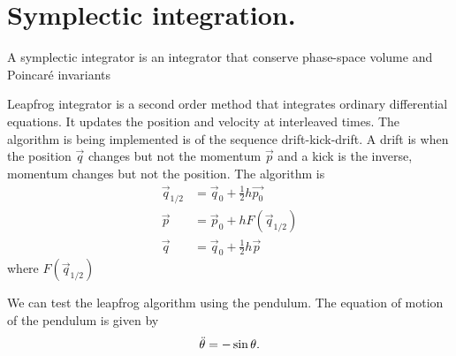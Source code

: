 \section{Symplectic integration.}
A symplectic integrator is an integrator that conserve phase-space volume and Poincar\' e invariants \cite{BinneyT_}

Leapfrog integrator is a second order method that integrates ordinary differential equations. It updates the position and velocity at interleaved times. The algorithm is being implemented is of the sequence drift-kick-drift. A drift is when the position $\Vec{q}$ changes but not the momentum $\Vec{p}$ and a kick is the inverse, momentum changes but not the position. The algorithm is
\begin{align*}
    \Vec{q}_{1/2}&=\Vec{q}_0+\frac{1}{2}h\Vec{p_0}\\
    \Vec{p}&=\Vec{p}_0 + h F(\Vec{q}_{1/2})\\
    \Vec{q}&=\Vec{q}_0 + \frac{1}{2}h\Vec{p}
\end{align*}
where $F(\Vec{q}_{1/2})$

We can test the leapfrog algorithm using the pendulum. 
The equation of motion of the pendulum is given by
\begin{equation}
    \Ddot{\theta}=-\sin\theta.
\end{equation}


